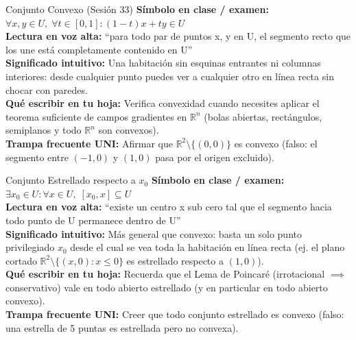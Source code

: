 \documentclass[11pt,a4paper]{article}
\begin{document}
\begin{definicionbox}{Conjunto Convexo (Sesión 33)}
\textbf{Símbolo en clase / examen:} $\forall x, y \in U,\; \forall t \in [0,1] : (1-t)x + t y \in U$\\[0.15cm]
\textbf{Lectura en voz alta:} ``para todo par de puntos x, y en U, el segmento recto que los une está completamente contenido en U''\\[0.12cm]
\textbf{Significado intuitivo:} Una habitación sin esquinas entrantes ni columnas interiores: desde cualquier punto puedes ver a cualquier otro en línea recta sin chocar con paredes.\\[0.12cm]
\textbf{Qué escribir en tu hoja:} Verifica convexidad cuando necesites aplicar el teorema suficiente de campos gradientes en $\mathbb{R}^n$ (bolas abiertas, rectángulos, semiplanos y todo $\mathbb{R}^n$ son convexos).\\[0.12cm]
\textbf{Trampa frecuente UNI:} Afirmar que $\mathbb{R}^2 \setminus \{(0,0)\}$ es convexo (falso: el segmento entre $(-1,0)$ y $(1,0)$ pasa por el origen excluido).
\end{definicionbox}

\begin{definicionbox}{Conjunto Estrellado respecto a $x_0$}
\textbf{Símbolo en clase / examen:} $\exists x_0 \in U : \forall x \in U,\; [x_0, x] \subseteq U$\\[0.15cm]
\textbf{Lectura en voz alta:} ``existe un centro x sub cero tal que el segmento hacia todo punto de U permanece dentro de U''\\[0.12cm]
\textbf{Significado intuitivo:} Más general que convexo: basta un solo punto privilegiado $x_0$ desde el cual se vea toda la habitación en línea recta (ej. el plano cortado $\mathbb{R}^2 \setminus \{(x,0) : x \le 0\}$ es estrellado respecto a $(1,0)$).\\[0.12cm]
\textbf{Qué escribir en tu hoja:} Recuerda que el Lema de Poincaré (irrotacional $\implies$ conservativo) vale en todo abierto estrellado (y en particular en todo abierto convexo).\\[0.12cm]
\textbf{Trampa frecuente UNI:} Creer que todo conjunto estrellado es convexo (falso: una estrella de 5 puntas es estrellada pero no convexa).
\end{definicionbox}
\end{document}
